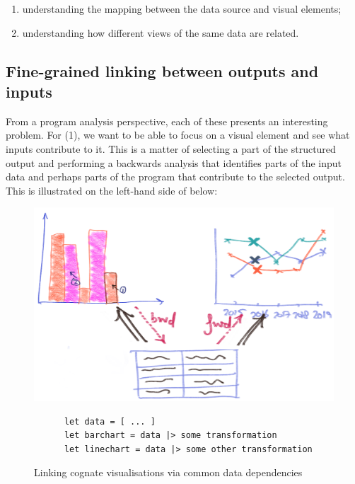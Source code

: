 \begin{enumerate}
  \item understanding the mapping between the data source and visual elements;
  \item understanding how different views of the same data are related.
\end{enumerate}

\subsection{Fine-grained linking between outputs and inputs}

\noindent From a program analysis perspective, each of these presents an interesting problem. For (1), we want to be able to focus on a visual element and see what inputs contribute to it. This is a matter of selecting a part of the structured output and performing a backwards analysis that identifies parts of the input data and perhaps parts of the program that contribute to the selected output. This is illustrated on the left-hand side of  below:

\begin{figure}[H]
   {\includegraphics[scale=0.14]{fig/example/vis-linking.png}}
   \small
   \begin{lstlisting}
      let data = [ ... ]
      let barchart = data |> some transformation
      let linechart = data |> some other transformation
   \end{lstlisting}
   \caption{Linking cognate visualisations via common data dependencies}
   \label{fig:introduction:vis-linking}
\end{figure}

